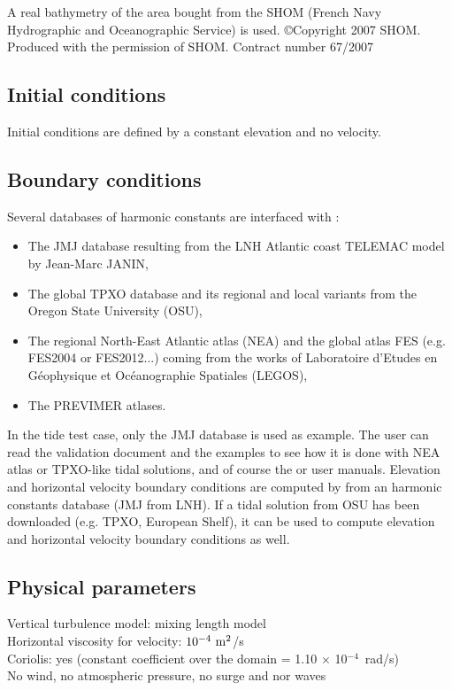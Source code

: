 A real bathymetry of the area bought from the SHOM (French Navy
Hydrographic and Oceanographic Service) is used.
\copyright Copyright 2007 SHOM. Produced with the permission of SHOM.
Contract number 67/2007

\subsection{Initial conditions}

Initial conditions are defined by a constant elevation and no velocity.

\subsection{Boundary conditions}

Several databases of harmonic constants are interfaced with
:
\begin{itemize}
\item The JMJ database resulting from the LNH Atlantic coast TELEMAC
model by Jean-Marc JANIN,
\item The global TPXO database and its regional and local variants
from the Oregon State University (OSU),
\item The regional North-East Atlantic atlas (NEA) and the global
atlas FES (e.g. FES2004 or FES2012...) coming from the works of
Laboratoire d’Etudes en Géophysique et Océanographie Spatiales (LEGOS),
\item The PREVIMER atlases.
\end{itemize}

In the tide test case, only the JMJ database is used as example.
The user can read the  validation document and the 
examples to see how it is done with NEA atlas or TPXO-like tidal solutions,
and of course the  or  user manuals.
Elevation and horizontal velocity boundary conditions are computed by
 from an harmonic constants database (JMJ from LNH).
If a tidal solution from OSU has been downloaded (e.g. TPXO, European
Shelf), it can be used to compute elevation and horizontal velocity
boundary conditions as well.

\subsection{Physical parameters}

Vertical turbulence model: mixing length model\\
Horizontal viscosity for velocity: $10^{-4}~\rm{m}^2$/s\\
Coriolis: yes (constant coefficient over the domain
= 1.10 $\times$ 10$^{-4}$~rad/s)\\
No wind, no atmospheric pressure, no surge and nor waves


